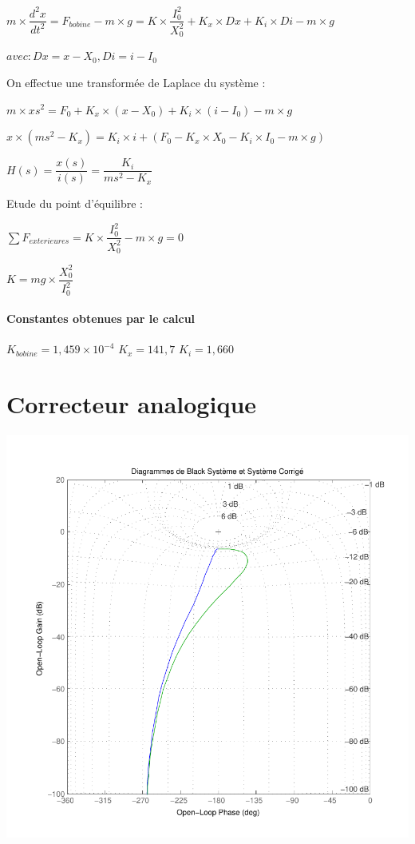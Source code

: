 \documentclass[11pt, french]{article} %
\begin{document}
$ m \times {\dfrac{{d^2}x}{dt^2}} = F_{bobine} - m \times g = K \times {\dfrac{I_0^2}{X_0^2}} + K_x \times Dx + K_i \times Di - m \times g $

$ avec : Dx = x - X_0, Di = i - I_0 $

On effectue une transformée de Laplace du système :
\newline

$ m \times x{s^2} = F_0 + K_x \times (x - X_0) + K_i \times (i - I_0) - m \times g $

$ x \times (m{s^2} - K_x) = K_i \times i +(F_0 - K_x \times X_0 - K_i \times I_0 - m \times g) $

$ H(s) = \dfrac{x(s)}{i(s)} = \dfrac{K_i}{m{s^2}- K_x}  $

Etude du point d'équilibre :
\newline

$ \sum F_{exterieures}  = K \times {\dfrac{I_0^2}{X_0^2}} - m \times g = 0 $

$ K = mg \times {\dfrac{X_0^2}{I_0^2}} $

\paragraph{Constantes obtenues par le calcul}

$ K_{bobine} = 1,459 \times 10^{-4} $
$ K_x = 141,7 $
$ K_i = 1,660 $

\section{Correcteur analogique}


\includegraphics[scale=0.50]{MatBlackFredValues.pdf}
\end{document}
